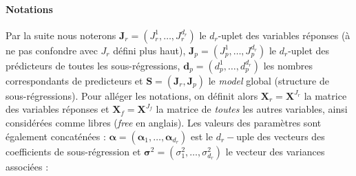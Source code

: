 \documentclass[12pt,a4paper]{report}
\begin{document}
\paragraph{Notations} Par la suite nous noterons $\boldsymbol{J}_r=(J_{r}^1,\ldots,J_r^{d_r})$ le $d_r$-uplet des variables réponses (à ne pas confondre avec $J_r$ défini plus haut), $\boldsymbol{J}_p=(J_{p}^1,\ldots,J_p^{d_r})$ le $d_r$-uplet des prédicteurs de toutes les sous-régressions, $\boldsymbol{d}_p=(d_p^1,\ldots,d_p^{d_{r}})$ les nombres correspondants de predicteurs et $\boldsymbol{S}=(\boldsymbol{J}_r,\boldsymbol{J}_p)$ le {\it model} global (structure de sous-régressions). Pour alléger les notations, on définit alors $\boldsymbol{X}_r=\boldsymbol{X}^{J_{r}}$ la matrice des variables réponses et $\boldsymbol{X}_f=\boldsymbol{X}^{J_{f}}$ la matrice de {\it toutes} les autres variables, ainsi considérées comme libres ({\it free} en anglais). Les valeurs des paramètres sont également concaténées : $\boldsymbol{\alpha}=(\boldsymbol{\alpha}_1,\ldots,\boldsymbol{\alpha}_{d_r})$ est le $d_r-$uple des vecteurs des coefficients de sous-régression et $\boldsymbol{\sigma}^2=(\sigma^2_1,\ldots,\sigma^2_{d_r})$ le vecteur des variances associées :
\end{document}
